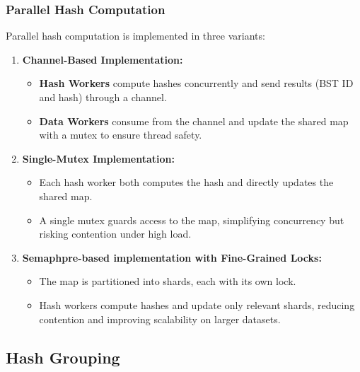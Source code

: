\documentclass[letterpaper,12pt]{article}
\theoremstyle{remark}
\begin{document}
\subsubsection{Parallel Hash Computation}
Parallel hash computation is implemented in three variants:

\begin{enumerate}
    \item \textbf{Channel-Based Implementation:} 
    \begin{itemize}
        \item \textbf{Hash Workers} compute hashes concurrently and send results (BST ID and hash) through a channel.
        \item \textbf{Data Workers} consume from the channel and update the shared map with a mutex to ensure thread safety.
    \end{itemize}
    
    \item \textbf{Single-Mutex Implementation:} 
    \begin{itemize}
        \item Each hash worker both computes the hash and directly updates the shared map.
        \item A single mutex guards access to the map, simplifying concurrency but risking contention under high load.
    \end{itemize}
    
    \item \textbf{Semaphpre-based implementation with Fine-Grained Locks:} 
    \begin{itemize}
        \item The map is partitioned into shards, each with its own lock.
        \item Hash workers compute hashes and update only relevant shards, reducing contention and improving scalability on larger datasets.
    \end{itemize}
\end{enumerate}






\subsection{Hash Grouping}
\end{document}
